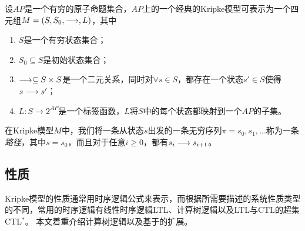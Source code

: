 \begin{definition}[经典的Kripke模型]
	设$AP$是一个有穷的原子命题集合，$AP$上的一个经典的Kripke模型可表示为一个四元组$M=(S,S_0,\longrightarrow,L)$，其中
	\begin{enumerate}
		\item $S$是一个有穷状态集合；
		\item $S_0\subseteq S$是初始状态集合；
		\item $\longrightarrow\subseteq S\times S$是一个二元关系，同时对$\forall s\in S$，都存在一个状态$s'\in S$使得$s\longrightarrow s'$；
		\item $L:S\rightarrow 2^{AP}$是一个标签函数，$L$将$S$中的每个状态都映射到一个$AP$的子集。
	\end{enumerate}
\end{definition}
在Kripke模型$M$中，我们将一条从状态$s$出发的一条无穷序列$\pi=s_0,s_1,...$称为一条\textit{路径}，其中$s=s_0$，而且对于任意$i\ge 0$，都有$s_i\longrightarrow s_{i+1}$。

\subsection{性质}
Kripke模型的性质通常用时序逻辑公式来表示，而根据所需要描述的系统性质类型的不同，常用的时序逻辑有线性时序逻辑\textsf{LTL}\cite{Pnueli77}、计算树逻辑\CTL{}\cite{ClarkeE08}以及\textsf{LTL}与\textsf{CTL}的超集\textsf{CTL$^*$}\cite{EmersonH86}。
本文着重介绍计算树逻辑\CTL{}以及基于\CTL{}的扩展。

